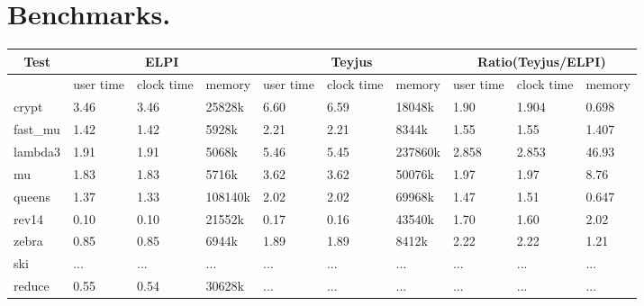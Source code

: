 \documentclass{llncs}
\begin{document}
\section{Benchmarks.}\label{sec:benchmarks}







\begin{center}

 \begin{table}
  \begin{tabular}{|p{1.2cm}||p{1.1cm}|p{1.1cm}|p{1.3cm}||p{1.1cm}|p{1.1cm}|p{1.3cm}||p{1.1cm}|p{1.1cm}|p{1.3cm}|}
    \hline
      \multicolumn{1}{|c||}{Test} &
      \multicolumn{3}{|c||}{ELPI} &
      \multicolumn{3}{|c||}{Teyjus} &
      \multicolumn{3}{|c|}{Ratio(Teyjus/ELPI)} \\
    \hline
      & user time & clock time & memory & user time & clock time & memory & user time & clock time & memory \\
    \hline
    crypt & 3.46 & 3.46 & 25828k & 6.60 & 6.59 & 18048k & 1.90 & 1.904 & 0.698 \\
    \hline
    fast\_mu & 1.42 & 1.42 & 5928k & 2.21 & 2.21 & 8344k & 1.55 & 1.55 & 1.407 \\
    \hline
    lambda3 & 1.91 & 1.91 & 5068k & 5.46 & 5.45 & 237860k & 2.858 & 2.853 & 46.93 \\
    \hline
    mu & 1.83 & 1.83 & 5716k & 3.62 & 3.62 & 50076k & 1.97 & 1.97 & 8.76 \\
    \hline
    queens & 1.37 & 1.33  & 108140k & 2.02 & 2.02 & 69968k & 1.47 & 1.51 & 0.647 \\
    \hline
    rev14 & 0.10 & 0.10 & 21552k & 0.17 & 0.16 & 43540k & 1.70 & 1.60 & 2.02 \\
    \hline
    zebra & 0.85 & 0.85 & 6944k & 1.89 & 1.89 & 8412k & 2.22 & 2.22 & 1.21 \\
    \hline
    ski & ... & ... & ... & ... & ... & ... & ... & ... & ... \\
    \hline
    reduce & 0.55 & 0.54 & 30628k & ... & ... & ... & ... & ... & ... \\
    \hline
  \end{tabular}
 \end{table}

 \end{center}



 
 


\end{document}
